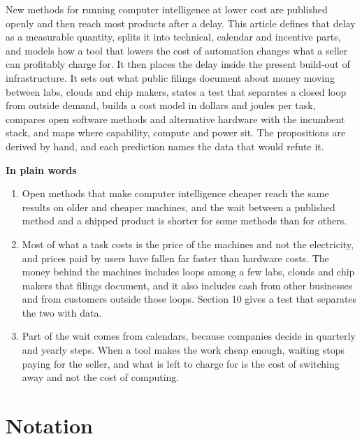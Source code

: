 \documentclass[10pt,letterpaper]{article}
\providecommand{\tightlist}{\setlength{\itemsep}{1pt}\setlength{\parskip}{0pt}}
\begin{document}
New methods for running computer intelligence at lower cost are
published openly and then reach most products after a delay. This
article defines that delay as a measurable quantity, splits it into
technical, calendar and incentive parts, and models how a tool that
lowers the cost of automation changes what a seller can profitably
charge for. It then places the delay inside the present build-out of
infrastructure. It sets out what public filings document about money
moving between labs, clouds and chip makers, states a test that
separates a closed loop from outside demand, builds a cost model in
dollars and joules per task, compares open software methods and
alternative hardware with the incumbent stack, and maps where
capability, compute and power sit. The propositions are derived by hand,
and each prediction names the data that would refute it.

\textbf{In plain words}

\begin{enumerate}
\def\labelenumi{\arabic{enumi}.}
\tightlist
\item
  Open methods that make computer intelligence cheaper reach the same
  results on older and cheaper machines, and the wait between a
  published method and a shipped product is shorter for some methods
  than for others.
\item
  Most of what a task costs is the price of the machines and not the
  electricity, and prices paid by users have fallen far faster than
  hardware costs. The money behind the machines includes loops among a
  few labs, clouds and chip makers that filings document, and it also
  includes cash from other businesses and from customers outside those
  loops. Section 10 gives a test that separates the two with data.
\item
  Part of the wait comes from calendars, because companies decide in
  quarterly and yearly steps. When a tool makes the work cheap enough,
  waiting stops paying for the seller, and what is left to charge for is
  the cost of switching away and not the cost of computing.
\end{enumerate}

\section{Notation}\label{notation}
\end{document}
